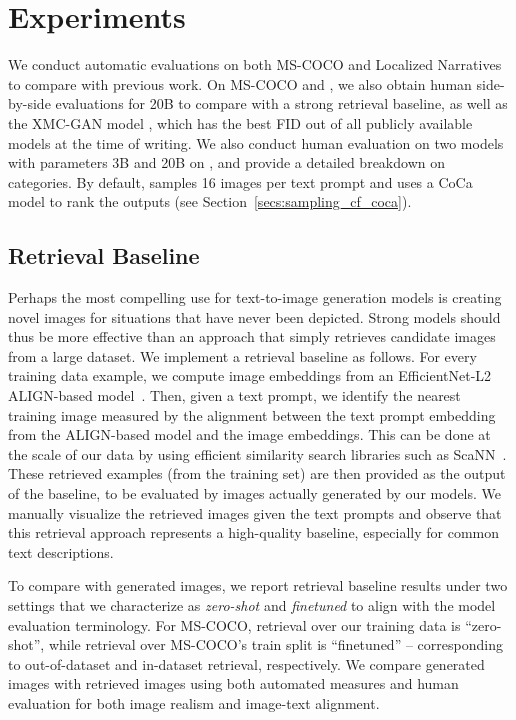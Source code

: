 \section{Experiments}

We conduct automatic evaluations on both MS-COCO and Localized Narratives to compare with previous work. On MS-COCO and \bcp, we also obtain human side-by-side evaluations for \bdraw 20B to compare with a strong retrieval baseline, as well as the XMC-GAN model \cite{zhang2021cross}, which has the best FID out of all publicly available models at the time of writing. We also conduct human evaluation on two \bdraw models with parameters 3B and 20B on \bcp, and provide a detailed breakdown on categories. By default, \bdraw samples 16 images per text prompt and uses a CoCa model to rank the outputs (see Section~\ref{secs:sampling_cf_coca}).

\subsection{Retrieval Baseline}  \label{secs:retrieval_model}
Perhaps the most compelling use for text-to-image generation models is creating novel images for situations that have never been depicted. Strong models should thus be more effective than an approach that simply retrieves candidate images from a large dataset. We implement a retrieval baseline as follows. For every training data example, we compute image embeddings from an EfficientNet-L2 ALIGN-based model~\cite{jia2021scaling}. Then, given a text prompt, we identify the nearest training image measured by the alignment between the text prompt embedding from the ALIGN-based model and the image embeddings. This can be done at the scale of our data by using efficient similarity search libraries such as ScaNN~\cite{avq_2020}. These retrieved examples (from the training set) are then provided as the output of the baseline, to be evaluated by images actually generated by our models. We manually visualize the retrieved images given the text prompts and observe that this retrieval approach represents a high-quality baseline, especially for common text descriptions.

To compare with \bdraw generated images, we report retrieval baseline results under two settings that we characterize as \textit{zero-shot} and \textit{finetuned} to align with the model evaluation terminology. For MS-COCO, retrieval over our training data is ``zero-shot'', while retrieval over MS-COCO's train split is ``finetuned'' -- corresponding to out-of-dataset and in-dataset retrieval, respectively. We compare \bdraw generated images with retrieved images using both automated measures and human evaluation for both image realism and image-text alignment.

